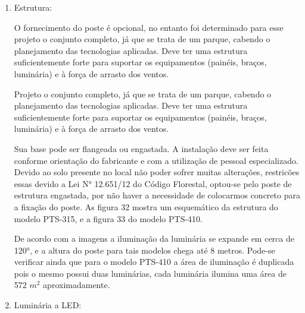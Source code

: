\begin{enumerate}
	\item Estrutura:
		
	O fornecimento do poste é opcional, no entanto foi determinado para esse projeto o conjunto completo, já que se trata de um parque, cabendo o planejamento das tecnologias aplicadas. Deve ter uma estrutura suficientemente forte para suportar os equipamentos (painéis, braços, luminária) e à  força de arrasto dos ventos.
	
	Projeto o conjunto completo, já que se trata de um parque, cabendo o planejamento das tecnologias aplicadas. Deve ter uma estrutura suficientemente forte para suportar os equipamentos (painéis, braços, luminária) e à  força de arrasto dos ventos. 
	
	Sua base pode ser flangeada ou engastada. A instalação deve ser feita conforme orientação do fabricante e com a utilização de pessoal especializado. Devido ao solo presente no local não poder sofrer muitas alterações, restricões essas devido a Lei N° 12.651/12 do Código Florestal, optou-se pelo poste de estrutura engastada, por não haver a necessidade de colocarmos concreto para a fixação do poste. As figura 32 mostra um esquemático da estrutura do modelo PTS-315, e a figura 33 do modelo PTS-410.

		De acordo com a imagens a iluminação da luminária se expande em cerca de 120°, e a altura do poste para tais modelos chega até 8 metros. Pode-se verificar ainda que  para o modelo PTS-410 a área de iluminação é duplicada pois o mesmo possui duas luminárias, cada luminária ilumina uma área  de 572 $m^{2}$ aproximadamente.


	\item Luminária a LED:
	

\end{enumerate}
